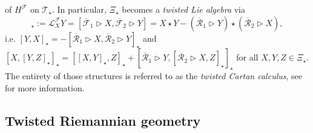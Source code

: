 \documentclass[a4paper,11pt]{article}
\begin{document}
of $H^\mathcal{F}$ on $\mathcal{T}_\star$. In particular, $\Xi_\star$ becomes a
\textit{twisted Lie algebra} via 
\begin{equation}
    [X,Y]_\star:=\mathcal{L}^\mathcal{F}_XY
    =[\overline{\mathcal{F}}_1\rhd X,\overline{\mathcal{F}}_2\rhd Y]
    =X\star Y-(\overline{\mathcal{R}}_1\rhd Y)\star(\overline{\mathcal{R}}_2\rhd X),
\end{equation}
i.e. $[Y,X]_\star=-[\overline{\mathcal{R}}_1\rhd X,\overline{\mathcal{R}}_2\rhd Y]_\star$
and $[X,[Y,Z]_\star]_\star=[[X,Y]_\star,Z]_\star+[\overline{\mathcal{R}}_1\rhd Y,
[\overline{\mathcal{R}}_2\rhd X,Z]_\star]_\star$
for all $X,Y,Z\in\Xi_\star$. The entirety of those structures is referred to as the
\textit{twisted Cartan calculus}, see \cite{Aschieri2006,TWeber2019} for more information.

\subsection{Twisted Riemannian geometry}\label{sectRG}
\end{document}
